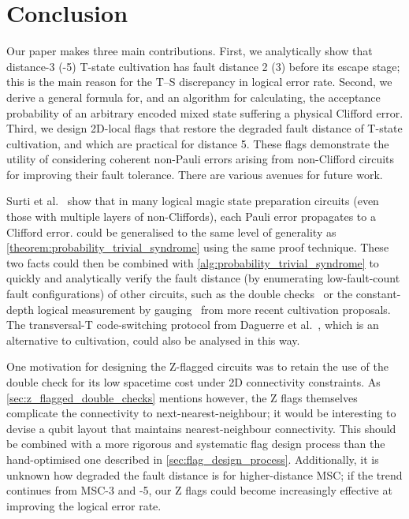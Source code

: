 \section{Conclusion}\label{sec:conclusion}
Our paper makes three main contributions.
First,
we analytically show that distance-3 (-5) T-state cultivation
has fault distance 2 (3) before its escape stage;
this is the main reason for the T--S discrepancy
in logical error rate.
Second,
we derive a general formula for,
and an algorithm for calculating,
the acceptance probability of
an arbitrary encoded mixed state suffering a physical Clifford error.
Third,
we design 2D-local flags that restore
the degraded fault distance of T-state cultivation,
and which are practical for distance 5.
These flags demonstrate the utility of considering
coherent non-Pauli errors arising from non-Clifford circuits
for improving their fault tolerance.
There are various avenues for future work.

Surti et al.~\cite{Surti2026} show that
in many logical magic state preparation circuits
(even those with multiple layers of non-Cliffords),
each Pauli error propagates to a Clifford error.
 could be generalised to
the same level of generality as \cref{theorem:probability_trivial_syndrome}
using the same proof technique.
These two facts could then be combined with
\cref{alg:probability_trivial_syndrome}
to quickly and analytically verify the fault distance
(by enumerating low-fault-count fault configurations)
of other circuits, such as
the double checks~\cite{Chen2026,Vaknin2025,Claes2025}
or the constant-depth logical measurement by gauging~\cite{Hetenyi2026}
from more recent cultivation proposals.
The transversal-T code-switching protocol
from Daguerre et al.~\cite{Daguerre2025,Daguerre2025a},
which is an alternative to cultivation,
could also be analysed in this way.

One motivation for designing the Z-flagged circuits
was to retain the use of the double check
for its low spacetime cost under 2D connectivity constraints.
As \cref{sec:z_flagged_double_checks} mentions however,
the Z flags themselves complicate the connectivity
to next-nearest-neighbour;
it would be interesting to devise a qubit layout
that maintains nearest-neighbour connectivity.
This should be combined with
a more rigorous and systematic flag design process
than the hand-optimised one described in \cref{sec:flag_design_process}.
Additionally,
it is unknown how degraded the fault distance is for higher-distance MSC;
if the trend continues from MSC-3 and -5,
our Z flags could become increasingly effective at improving
the logical error rate.